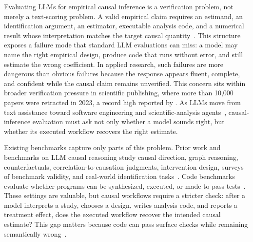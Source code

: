 \documentclass{article}
\begin{document}
Evaluating LLMs for empirical causal inference is a verification
problem, not merely a text-scoring problem. A valid empirical claim
requires an estimand, an identification argument, an estimator,
executable analysis code, and a numerical result whose interpretation
matches the target causal quantity~\citep{rubin1974estimating,
rosenbaum1983central,holland1986statistics,pearl2009causality,
imbens2015causal,angrist2009mostly}. This structure exposes a failure mode that standard
LLM evaluations can miss: a model may name the right empirical design,
produce code that runs without error, and still estimate the wrong
coefficient. In applied research, such failures are more dangerous than
obvious failures because the response appears fluent, complete, and
confident while the causal claim remains unverified. This concern sits
within broader verification pressure in scientific publishing, where
more than 10{,}000 papers were retracted in 2023, a record high
reported by \citet{vannoorden2023retractions}. As LLMs move from text
assistance toward software engineering and scientific-analysis
agents~\citep{gao2023pal,yao2023react,schick2023toolformer,
liu2023agentbench,wu2023autogen,huang2024mlagentbench,
jimenez2024swe,majumder2024discoverybench,chen2024scienceagentbench},
causal-inference evaluation must ask not
only whether a model sounds right, but whether its executed workflow
recovers the right estimate.

Existing benchmarks capture only parts of this problem. Prior work
and benchmarks on LLM causal reasoning study causal direction, graph
reasoning, counterfactuals, correlation-to-causation judgments,
intervention design, surveys of benchmark validity, and real-world
identification tasks~\citep{kiciman2023causal,zecevic2023causalparrots,
jin2023cladder,jin2024corr2cause,chen2024clear,chi2024unveiling,
yang2024criticalreview,ma2025causalsurvey,zhou2024causalbench,
acharya2025causcibench,lee2025econcausal,shi2026intervenebench,
sawarni2026causalreasoningbenchmark}. Code benchmarks evaluate whether
programs can be synthesized, executed, or made to pass
tests~\citep{chen2021codex,austin2021program,hendrycks2021apps,
li2022alphacode,lu2021codexglue,cassano2023multiple,lai2023ds1000,
gu2024cruxeval,jimenez2024swe,jain2024livecodebench,
zhuo2024bigcodebench}. These
settings are valuable, but causal workflows require a stricter check:
after a model interprets a study, chooses a design, writes analysis
code, and reports a treatment effect, does the executed workflow
recover the intended causal estimate? This gap matters because code can
pass surface checks while remaining semantically
wrong~\citep{liu2023chatgptcode}.
\end{document}

